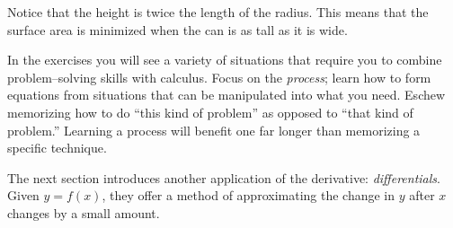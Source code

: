 {Notice that the height is twice the length of the radius. This means that the surface area is minimized when the can is as tall as it is wide.}

In the exercises you will see a variety of situations that require you to combine problem--solving skills with calculus. Focus on the \textit{process}; learn how to form equations from situations that can be manipulated into what you need. Eschew memorizing how to do ``this kind of problem'' as opposed to ``that kind of problem.'' Learning a process will benefit one far longer than memorizing a specific technique.

The next section introduces another application of the derivative: \textit{differentials}. Given $y=f(x)$, they offer a method of approximating the change in $y$ after $x$ changes by a small amount. 

